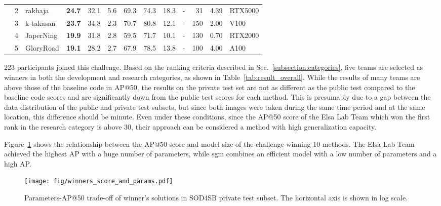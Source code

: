 \documentclass{mva_style}
\begin{document}
\begin{table*}[t!]
{\begin{tabular}{c|c|l|rrr|rrr|c|r|r|l}
          & 2     & rakhaja & \textbf{24.7} & 32.1  & 5.6   & 69.3  & 74.3  & 18.3  & -     & 31    & 4.39  & RTX5000 \\
          & 3     & k-takasan & \textbf{23.7} & 34.8  & 2.3   & 70.7  & 80.8  & 12.1  & -     & 150   & 2.00  & V100 \\
          & 4     & JaperNing & \textbf{19.9} & 31.8  & 2.8   & 59.5  & 71.7  & 10.1  & -     & 130   & 0.70  &  RTX2000\\
          & 5     & GloryRoad & \textbf{19.1} & 28.2  & 2.7   & 67.9  & 78.5  & 13.8  & -     & 100   & 4.00  & A100 \\
    \bottomrule
    \end{tabular}}
  \label{tab:result_overall}\end{table*}


223 participants joined this challenge.
Based on the ranking criteria described in Sec.~\ref{subsection:categories}, five teams are selected as winners in both the development and research categories, as shown in Table~\ref{tab:result_overall}.
While the results of many teams are above those of the baseline code in AP@50, the results on the private test set are not as different as the public test compared to the baseline code scores and are significantly down from the public test scores for each method.
This is presumably due to a gap between the data distribution of the public and private test subsets, but since both images were taken during the same time period and at the same location, this difference should be minute.
Even under these conditions, since the AP@50 score of the Elsa Lab Team which won the first rank in the research category is above 30, their approach can be considered a method with high generalization capacity.

Figure~\ref{fig:params_score} shows the relationship between the AP@50 score and model size of the challenge-winning 10 methods. The Elsa Lab Team achieved the highest AP with a huge number of parameters, while sgm combines an efficient model with a low number of parameters and a high AP.

\begin{figure}[t]
  \centering
  \texttt{[image: fig/winners\_score\_and\_params.pdf]}
  \vspace{-7mm}
  \caption{
    Parameters-AP@50 trade-off of winner's solutions in SOD4SB private test subset. The horizontal axis is shown in log scale.
  }
  \vspace{-0.8em}
  \label{fig:params_score}
\end{figure}
\end{document}
